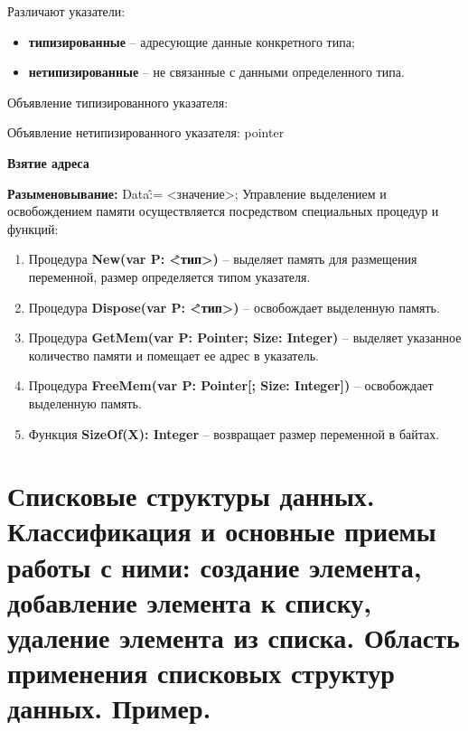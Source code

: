 Различают указатели: 

\begin{itemize}
\item {\bf{типизированные}} – адресующие данные конкретного типа;
\item {\bf{нетипизированные}} – не связанные с данными определенного типа.
\end{itemize}

Объявление типизированного указателя:


Объявление нетипизированного указателя: pointer

{\bf Взятие адреса}
 

{\bf Разыменовывание: }
Data\^ := <значение>;
\newpage
Управление выделением и освобождением памяти осуществляется посредством специальных процедур и функций:

\begin{enumerate}
\item Процедура {\bf New(var P: \^<тип>)} – выделяет память для размещения переменной, размер определяется типом указателя.
\item Процедура {\bf Dispose(var P: \^<тип>)} – освобождает выделенную память.
\item Процедура {\bf GetMem(var P: Pointer; Size: Integer)} – выделяет указанное количество памяти и помещает ее адрес в указатель.
\item Процедура {\bf FreeMem(var P: Pointer[; Size: Integer])} – освобождает выделенную память.
\item Функция {\bf SizeOf(X): Integer} – возвращает размер переменной в байтах.
\end{enumerate}







\newpage\section{Списковые  структуры  данных.  Классификация  и  основные  приемы  работы  с  ними:  создание элемента, добавление элемента к списку, удаление элемента из списка. Область применения списковых структур данных. Пример. }

\begin{myquote}
            
\end{myquote}

